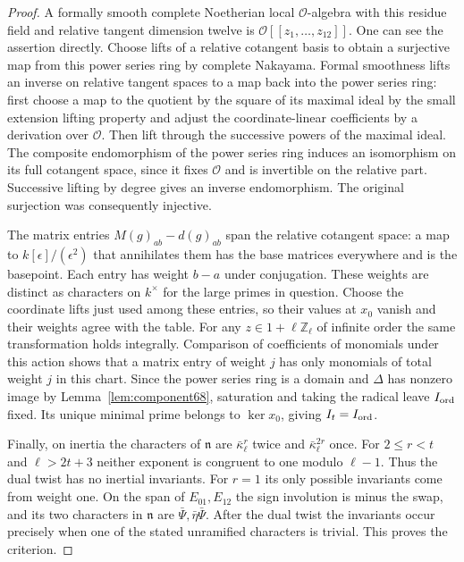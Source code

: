 \documentclass[a4paper,11pt]{article}
\theoremstyle{definition}
\theoremstyle{remark}
\newcommand{\ZZ}{\mathbb Z}\newcommand{\ord}{\operatorname{ord}}
\numberwithin{equation}{section}
\newcommand{\OO}{\mathcal O}
\begin{document}
\begin{proof}
A formally smooth complete Noetherian local \(\OO\)-algebra with
this residue field and relative tangent dimension twelve is
\(\OO[[z_1,\ldots,z_{12}]]\). One can see the assertion directly.
Choose lifts of a relative cotangent basis to obtain a surjective
map from this power series ring by complete Nakayama. Formal
smoothness lifts an inverse on relative tangent spaces to a map
back into the power series ring: first choose a map to the
quotient by the square of its maximal ideal by the small extension
lifting property and adjust the coordinate-linear coefficients by
a derivation over \(\OO\). Then lift through the successive
powers of the maximal ideal. The composite endomorphism of the
power series ring induces an isomorphism on its full cotangent
space, since it fixes \(\OO\) and is invertible on the relative
part. Successive lifting by degree gives an inverse endomorphism.
The original surjection was consequently injective.

The matrix entries \(M(g)_{ab}-d(g)_{ab}\) span the relative
cotangent space: a map to \(k[\epsilon]/(\epsilon^2)\) that
annihilates them has the base matrices everywhere and is the
basepoint. Each entry has weight \(b-a\) under conjugation.
These weights are distinct as characters on \(k^\times\) for the
large primes in question. Choose the coordinate lifts just used
among these entries, so their values at \(x_0\) vanish and their
weights agree with the table. For any \(z\in1+\ell\ZZ_\ell\)
of infinite order the same transformation holds integrally.
Comparison of coefficients of monomials under this action shows
that a matrix entry of weight \(j\) has only monomials of total
weight \(j\) in this chart. Since the power series ring is a
domain and \(\Delta\) has nonzero image by
Lemma~\ref{lem:component68}, saturation and taking the radical
leave \(I_{\rm ord}\) fixed. Its unique minimal prime belongs to
\(\ker x_0\), giving \(I_t=I_{\rm ord}\).

Finally, on inertia the characters of \(\mathfrak n\) are
\(\bar\kappa_\ell^r\) twice and \(\bar\kappa_\ell^{2r}\)
once. For \(2\le r<t\) and \(\ell>2t+3\) neither exponent
is congruent to one modulo \(\ell-1\). Thus the dual twist has
no inertial invariants. For \(r=1\) its only possible invariants
come from weight one. On the span of \(E_{01},E_{12}\) the sign
involution is minus the swap, and its two characters in
\(\mathfrak n\) are \(\bar\Psi,\bar\eta\bar\Psi\).
After the dual twist the invariants occur precisely when one of
the stated unramified characters is trivial. This proves the
criterion.
\end{proof}
\end{document}
